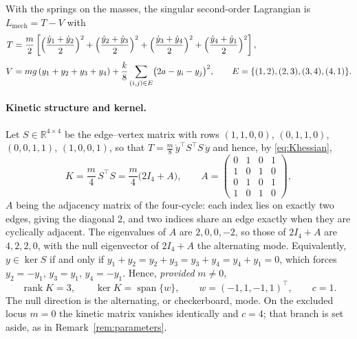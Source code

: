 \documentclass[12pt]{article}
\theoremstyle{plain}
\theoremstyle{definition}
\theoremstyle{remark}
\newcommand{\R}{\mathbb{R}}
\DeclareMathOperator{\rank}{rank}
\DeclareMathOperator{\spn}{span}
\begin{document}
	With the springs on the masses, the singular second-order Lagrangian is
	$L_{\mathrm{mech}}=T-V$ with
	\begin{align}
		T&=\frac m2\left[\Bigl(\frac{\dot y_{1}+\dot y_{2}}{2}\Bigr)^{2}
		+\Bigl(\frac{\dot y_{2}+\dot y_{3}}{2}\Bigr)^{2}
		+\Bigl(\frac{\dot y_{3}+\dot y_{4}}{2}\Bigr)^{2}
		+\Bigl(\frac{\dot y_{4}+\dot y_{1}}{2}\Bigr)^{2}\right],
		\label{eq:squareT}\\[0.3em]
		V&=mg\,(y_{1}+y_{2}+y_{3}+y_{4})
		+\frac{k}{8}\sum_{(i,j)\in E}\bigl(2a-y_{i}-y_{j}\bigr)^{2},
		\qquad
		E=\{(1,2),(2,3),(3,4),(4,1)\}.
		\label{eq:squareV}
	\end{align}
	
	\paragraph{Kinetic structure and kernel.} Let $S\in\R^{4\times4}$ be the
	edge--vertex matrix with rows $(1,1,0,0)$, $(0,1,1,0)$, $(0,0,1,1)$,
	$(1,0,0,1)$, so that $T=\tfrac m8\,\dot y^{\top}S^{\top}S\,\dot y$ and hence,
	by \eqref{eq:Khessian},
	\begin{equation}
		K=\frac m4\,S^{\top}S=\frac m4\bigl(2I_{4}+A\bigr),
		\qquad
		A=\begin{pmatrix}0&1&0&1\\ 1&0&1&0\\ 0&1&0&1\\ 1&0&1&0\end{pmatrix},
		\label{eq:squareK}
	\end{equation}
	$A$ being the adjacency matrix of the four-cycle: each index lies on exactly
	two edges, giving the diagonal $2$, and two indices share an edge exactly when
	they are cyclically adjacent. The eigenvalues of $A$ are $2,0,0,-2$, so those
	of $2I_{4}+A$ are $4,2,2,0$, with the null eigenvector of $2I_{4}+A$ the
	alternating mode. Equivalently, $y\in\ker S$ if and only if
	$y_{1}+y_{2}=y_{2}+y_{3}=y_{3}+y_{4}=y_{4}+y_{1}=0$, which forces
	$y_{2}=-y_{1}$, $y_{3}=y_{1}$, $y_{4}=-y_{1}$. Hence, \emph{provided}
	$m\neq0$,
	\begin{equation}
		\rank K=3,
		\qquad
		\ker K=\spn\{w\},\qquad w=(-1,1,-1,1)^{\top},
		\qquad c=1 .
		\label{eq:squareker}
	\end{equation}
	The null direction is the alternating, or checkerboard, mode. On the excluded
	locus $m=0$ the kinetic matrix vanishes identically and $c=4$; that branch is
	set aside, as in Remark~\ref{rem:parameters}.
	
\end{document}
